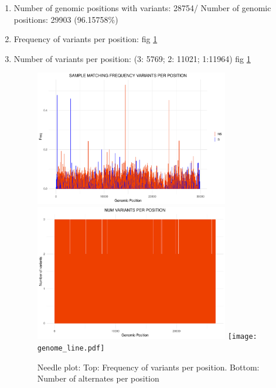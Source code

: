 \documentclass[a4paper, 10pt]{article}        %
\begin{document}
\begin{enumerate}
\item Number of genomic positions with variants: 28754/ Number of genomic positions: 29903 (96.15758\%)
\item Frequency of variants per position: fig \ref{fig:needle}
\item Number of variants per position: (3: 5769; 2: 11021; 1:11964) fig \ref{fig:needle}
   \begin{figure}[!htb]
     \centering
      \includegraphics[width=0.8\textwidth]{needle.pdf}
       \includegraphics[width=0.8\textwidth]{needle_vpp.pdf}
       \texttt{[image: genome\_line.pdf]}
     \caption{Needle plot: Top: Frequency of variants per position. Bottom: Number of alternates per position}
     \label{fig:needle}
     \end{figure}

\end{enumerate}
\end{document}
